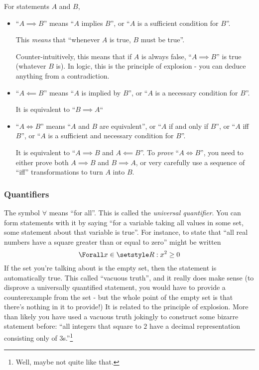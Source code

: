 For statements \(A\) and \(B\),
\begin{itemize}
 \item
  ``\(A \implies B\)'' means ``\(A\) implies \(B\)'', or
  ``\(A\) is a sufficient condition for \(B\)''.

  This \emph{means} that ``whenever \(A\) is true, \(B\) must be true''.

  Counter-intuitively, this means that if \(A\) is always false,
  ``\(A \implies B\)'' is true (whatever \(B\) is). In logic, this is the
  principle of explosion - you can deduce anything from a contradiction.
 \item
  ``\(A \impliedby B\)'' means ``\(A\) is implied by \(B\)'', or
  ``\(A\) is a necessary condition for \(B\)''.

  It is equivalent to ``\(B \implies A\)``
 \item
  ``\(A \iff B\)'' means ``\(A\) and \(B\) are equivalent'', or
  ``\(A\) if and only if \(B\)'', or ``\(A\) iff \(B\)'', or
  ``\(A\) is a sufficient and necessary condition for \(B\)''.

  It is equivalent to ``\(A \implies B\) and \(A \impliedby B\)''. To
  \emph{prove} ``\(A \iff B\)'', you need to either prove both
  \(A \implies B\) and \(B \implies A\), or very carefully use a sequence of
  ``iff'' transformations to turn \(A\) into \(B\).
\end{itemize}

\subsubsection{Quantifiers}

The symbol \(\forall\) means ``for all''. This is called the \emph{universal
quantifier}. You can form statements with it by saying ``for a variable taking
all values in some set, some statement about that variable is true''. For
instance, to state that ``all real numbers have a square greater than or equal
to zero'' might be written
\begin{equation*}
 \Forall x \in \Reals : x^2 \ge 0
\end{equation*}
If the set you're talking about is the empty set, then the statement is
automatically true. This called ``vacuous truth'', and it really does make sense
(to disprove a universally quantified statement, you would have to provide a
counterexample from the set - but the whole point of the empty set is that
there's nothing in it to provide!) It is related to the principle of explosion.
More than likely you have used a vacuous truth jokingly to construct some
bizarre statement before: ``all integers that square to \(2\) have a decimal
representation consisting only of \(3\)s.''\footnote{
 Well, maybe not quite like that.
}

